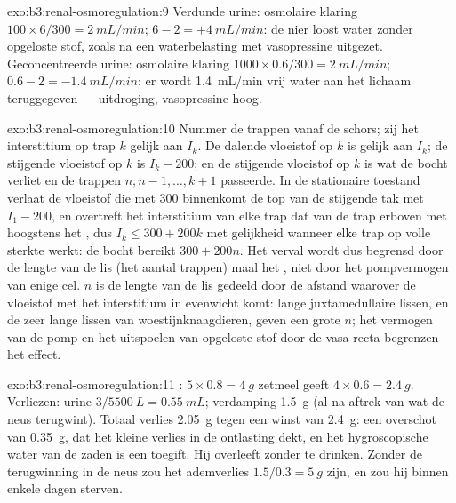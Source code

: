 \begin{solution}{exo:b3:renal-osmoregulation:9}
Verdunde urine: osmolaire klaring $100\times 6/300 = \qty{2}{mL/min}$;
 $6 - 2 = +\qty{4}{mL/min}$: de nier loost water zonder
opgeloste stof, zoals na een waterbelasting met vasopressine uitgezet.
Geconcentreerde urine: osmolaire klaring $1000\times 0.6/300 =
\qty{2}{mL/min}$;  $0.6 - 2 = -\qty{1.4}{mL/min}$: er
wordt \qty{1.4}{mL/min} vrij water aan het lichaam teruggegeven ---
uitdroging, vasopressine hoog.
\end{solution}

\begin{solution}{exo:b3:renal-osmoregulation:10}
Nummer de trappen vanaf de schors; zij het interstitium op trap $k$
gelijk aan $I_{k}$. De dalende vloeistof op $k$ is gelijk aan $I_{k}$;
de stijgende vloeistof op $k$ is $I_{k} - 200$; en de stijgende
vloeistof op $k$ is wat de bocht verliet en de trappen
$n, n-1, \dots, k+1$ passeerde. In de stationaire toestand verlaat de
vloeistof die met \qty{300}{} binnenkomt de top van de stijgende tak
met $I_{1} - 200$, en overtreft het interstitium van elke trap dat van
de trap erboven met hoogstens het , dus
$I_{k} \le 300 + 200k$ met gelijkheid wanneer elke trap op volle
sterkte werkt: de bocht bereikt $300 + 200n$. Het verval wordt dus
begrensd door de lengte van de lis (het aantal trappen) maal het
, niet door het pompvermogen van enige cel. $n$ is
de lengte van de lis gedeeld door de afstand waarover de vloeistof met
het interstitium in evenwicht komt: lange juxtamedullaire lissen, en de
zeer lange lissen van woestijnknaagdieren, geven een grote $n$; het
vermogen van de pomp en het uitspoelen van opgeloste stof door de vasa
recta begrenzen het effect.
\end{solution}

\begin{solution}{exo:b3:renal-osmoregulation:11}
: $5\times 0.8 = \qty{4}{g}$ zetmeel geeft $4\times 0.6
= \qty{2.4}{g}$. Verliezen: urine $3/5500\ \unit{L} = \qty{0.55}{mL}$;
verdamping \qty{1.5}{g} (al na aftrek van wat de neus terugwint).
Totaal verlies \qty{2.05}{g} tegen een winst van \qty{2.4}{g}: een
overschot van \qty{0.35}{g}, dat het kleine verlies in de ontlasting
dekt, en het hygroscopische water van de zaden is een toegift. Hij
overleeft zonder te drinken. Zonder de terugwinning in de neus zou het
ademverlies $1.5/0.3 = \qty{5}{g}$ zijn, en zou hij binnen enkele dagen
sterven.
\end{solution}

